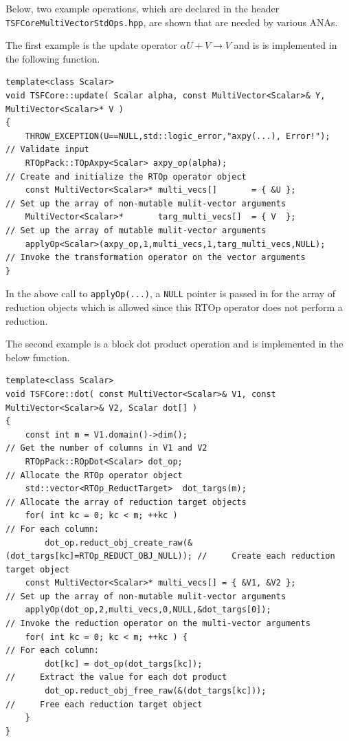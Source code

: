 \documentclass[10pt,fleqn]{article}
\begin{document}
Below, two example operations, which are declared in the header
\texttt{TSFCoreMultiVectorStdOps.hpp}, are shown that are needed
by various ANAs.

The first example is the update operator $\alpha U + V \rightarrow V$
and is is implemented in the following function.

{\scriptsize\begin{verbatim}
template<class Scalar>
void TSFCore::update( Scalar alpha, const MultiVector<Scalar>& Y, MultiVector<Scalar>* V )
{
    THROW_EXCEPTION(U==NULL,std::logic_error,"axpy(...), Error!");    // Validate input
    RTOpPack::TOpAxpy<Scalar> axpy_op(alpha);                         // Create and initialize the RTOp operator object
    const MultiVector<Scalar>* multi_vecs[]       = { &U };           // Set up the array of non-mutable mulit-vector arguments
    MultiVector<Scalar>*       targ_multi_vecs[]  = { V  };           // Set up the array of mutable mulit-vector arguments
    applyOp<Scalar>(axpy_op,1,multi_vecs,1,targ_multi_vecs,NULL);     // Invoke the transformation operator on the vector arguments
}
\end{verbatim}}

In the above call to \texttt{applyOp(...)}, a \texttt{NULL} pointer is
passed in for the array of reduction objects which is allowed since
this RTOp operator does not perform a reduction.

The second example is a block dot product operation and is implemented
in the below function.

{\scriptsize\begin{verbatim}
template<class Scalar>
void TSFCore::dot( const MultiVector<Scalar>& V1, const MultiVector<Scalar>& V2, Scalar dot[] )
{
    const int m = V1.domain()->dim();                                        // Get the number of columns in V1 and V2
    RTOpPack::ROpDot<Scalar> dot_op;                                         // Allocate the RTOp operator object
    std::vector<RTOp_ReductTarget>  dot_targs(m);                            // Allocate the array of reduction target objects
    for( int kc = 0; kc < m; ++kc )                                          // For each column:
        dot_op.reduct_obj_create_raw(&(dot_targs[kc]=RTOp_REDUCT_OBJ_NULL)); //     Create each reduction target object
    const MultiVector<Scalar>* multi_vecs[] = { &V1, &V2 };                  // Set up the array of non-mutable mulit-vector arguments
    applyOp(dot_op,2,multi_vecs,0,NULL,&dot_targs[0]);                       // Invoke the reduction operator on the multi-vector arguments
    for( int kc = 0; kc < m; ++kc ) {                                        // For each column:
        dot[kc] = dot_op(dot_targs[kc]);                                     //     Extract the value for each dot product
        dot_op.reduct_obj_free_raw(&(dot_targs[kc]));                        //     Free each reduction target object
    }
}
\end{verbatim}}
\end{document}
